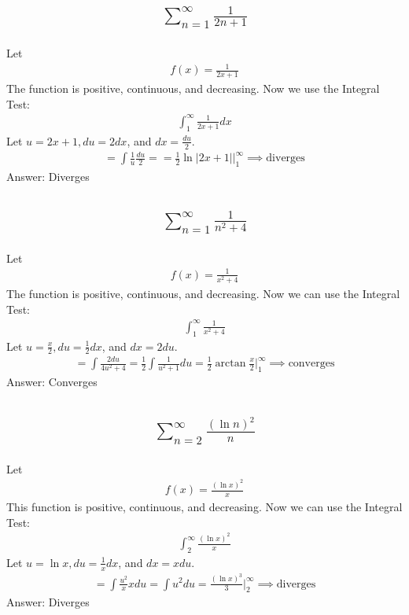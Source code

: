 \documentclass{article}
\begin{document}
\subsection{
	\begin{align*}
		\sum_{n = 1}^\infty \frac{1}{2n + 1}
	\end{align*}
}
Let
\begin{align*}
	f(x) = \frac{1}{2x + 1}
\end{align*}
The function is positive, continuous, and decreasing. Now we use the Integral Test:
\begin{align*}
	\int_1^\infty {\frac{1}{2x + 1} dx}
\end{align*}
Let $u = 2x + 1, du = 2dx$, and $dx = \frac{du}{2}$. 
\begin{align*}
	= \int{\frac{1}{u} \frac{du}{2}} = = \frac{1}{2} \ln{|2x + 1|} \bigg|_1^\infty \implies \text{diverges}
\end{align*}
Answer: Diverges

\subsection{
	\begin{align*}
		\sum_{n = 1}^\infty \frac{1}{n^2 + 4}
	\end{align*}
}
Let
\begin{align*}
	f(x) = \frac{1}{x^2 + 4}
\end{align*}
The function is positive, continuous, and decreasing. Now we can use the Integral Test:
\begin{align*}
	\int_1^\infty {\frac{1}{x^2 + 4}}
\end{align*}
Let $u = \frac{x}{2}, du = \frac{1}{2}dx$, and $dx = 2du$. 
\begin{align*}
	= \int{\frac{2du}{4u^2 + 4}} = \frac{1}{2} \int{\frac{1}{u^2 + 1} du} = \frac{1}{2} \arctan{\frac{x}{2}} \bigg|_1^\infty \implies \text{converges}
\end{align*}
Answer: Converges

\subsection{
	\begin{align*}
		\sum_{n = 2}^\infty \frac{(\ln{n})^2}{n}
	\end{align*}
}
Let
\begin{align*}
	f(x) = \frac{(\ln{x})^2}{x}
\end{align*}
This function is positive, continuous, and decreasing. Now we can use the Integral Test:
\begin{align*}
	\int_2^\infty{\frac{(\ln{x})^2}{x}}
\end{align*}
Let $u = \ln{x}, du = \frac{1}{x} dx$, and $dx = xdu$. 
\begin{align*}
	= \int{\frac{u^2}{x} xdu} = \int{u^2 du} = \frac{(\ln{x})^3}{3} \bigg|_2^\infty \implies \text{diverges}
\end{align*}
Answer: Diverges
\end{document}
